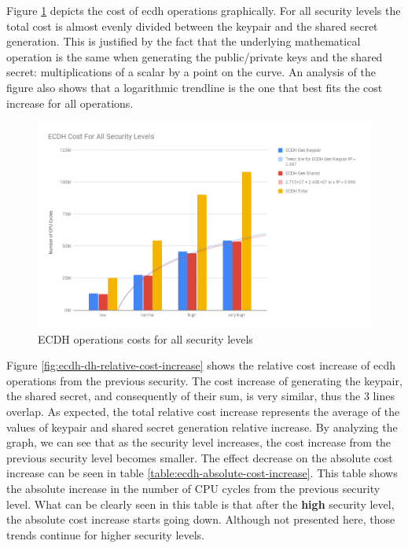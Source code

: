 Figure \ref{fig:ecdh-costs-all-sls} depicts the cost of \gls{ecdh} operations graphically. For all security levels the total cost is almost
evenly divided between the keypair and the shared secret generation. This is justified by the fact that the underlying mathematical operation is
the same when generating the public/private keys and the shared secret: multiplications of a scalar by a point on the curve. An analysis of the figure
also shows that a logarithmic trendline is the one that best fits the cost increase for all operations.

\begin{figure}
  \centering
  \includegraphics[width=1.0\textwidth]{img/ecdh_cost_all_sls.png}
  \centering \caption{\label{fig:ecdh-costs-all-sls} ECDH operations costs for all security levels}
\end{figure}

Figure \ref{fig:ecdh-dh-relative-cost-increase} shows the relative cost increase of \gls{ecdh} operations from the previous security.
The cost increase of generating the keypair, the shared secret, and consequently of their sum, is very similar, thus the $3$ lines overlap.
As expected, the total relative cost increase represents the average of the values of keypair and shared secret generation relative increase.
By analyzing the graph, we can see  that as the security level increases, the cost increase  from the previous security
level becomes smaller. The effect decrease on the absolute cost increase can be seen in table \ref{table:ecdh-absolute-cost-increase}.
This table shows the absolute increase in the number of CPU cycles from
the previous security level. What can be clearly seen in this table is that after the \textbf{high} security level, the absolute cost increase starts
going down. Although not presented here, those trends continue for higher security levels.

